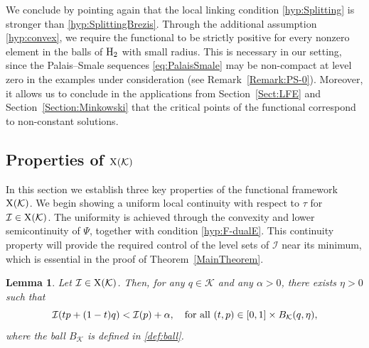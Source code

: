 \documentclass{article}
\newcommand{\boK}{\mathcal{K}}
\newcommand{\boI}{\mathcal{I}}
\newcommand{\Hilb}{{\textnormal H}}
\newcommand{\ball}{B_\boK}
\newcommand{\X}{{\textnormal X}}
\newtheorem{lemma}{Lemma}[section]
\theoremstyle{definition}
\begin{document}
We conclude by pointing again that the local linking condition \eqref{hyp:Splitting} is stronger than \eqref{hyp:SplittingBrezis}. Through the additional assumption \eqref{hyp:convex}, we require the functional to be strictly positive for every nonzero element in the balls of $\Hilb_2$ with small radius. This  is necessary in our setting, since the Palais–Smale sequences \eqref{eq:PalaisSmale} may be non-compact at level zero in the examples under consideration (see Remark~\ref{Remark:PS-0}). Moreover, it allows us to conclude in the applications from Section~\ref{Sect:LFE} and Section~\ref{Section:Minkowski} that the critical points of the functional correspond to non-constant solutions.


\subsection{Properties of \texorpdfstring{$\X(\boK)$}{}}\label{Sect:tau-levelsets} 

In this section we establish three key properties of the functional framework $\X(\boK)$. We begin showing a uniform local continuity with respect to $\tau$ for $\boI\in\X(\boK)$. The uniformity is achieved through the convexity and lower semicontinuity of $\Psi$, together with condition \eqref{hyp:F-dualE}. This continuity property will provide the required control of the level sets of $\boI$ near its minimum, which is essential in the proof of Theorem~\ref{MainTheorem}.


\begin{lemma}\label{lemma-alpha}
	Let $\boI\in\X(\boK)$. Then, for any $q\in\boK$ and any $\alpha>0$, there exists $\eta>0$ such that
	\begin{equation}\label{ineq:lemma1}
		\boI(tp+(1-t) q)<\boI(p)+\alpha,\quad\hbox{for all }(t,p)\in [0,1]\times\ball(q,\eta),
	\end{equation} 
	where the ball $\ball$ is defined in \eqref{def:ball}.
\end{lemma}
\end{document}
